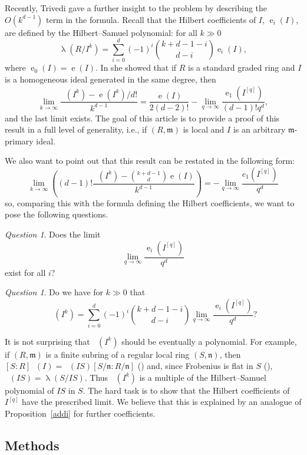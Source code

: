 \documentclass[12pt]{amsart}
\newcommand{\length}{\operatorname{\lambda}}
\newcommand{\mf}[1]{\mathfrak #1}
\DeclareMathOperator{\eh}{e}
\DeclareMathOperator{\ehk}{e_{HK}}
\renewcommand{\frq}[1]{{#1}^{[q]}}
\theoremstyle{definition}
\theoremstyle{remark}
\newtheorem{question}[theorem]{Question}
\numberwithin{theorem}{section}
\numberwithin{equation}{section}
\begin{document}
Recently, Trivedi gave a further insight to the problem by describing the $O(k^{d-1})$ term in the formula. 
Recall that the Hilbert coefficients of $I$, $\eh_i(I)$, are defined by  the Hilbert--Samuel polynomial: 
for all $k \gg 0$
\[
\length (R/I^k) = \sum_{i = 0}^{d} (-1)^i \binom{k + d - 1 - i}{d - i} \eh_i (I),
\]
where $\eh_0(I) =\eh(I)$.
In \cite{Trivedi} she showed that if $R$ is a standard graded ring and $I$ 
is a homogeneous ideal generated in the same degree, then 
\[
\lim_{k \to \infty} \frac{\ehk(I^k) - \eh(I^k)/d!}{k^{d - 1}} = 
\frac{\eh(I)}{2(d-2)!} - \lim_{q \to \infty} \frac{\eh_1 (\frq{I})}{(d-1)!q^d},
\]
and the last limit exists.
The goal of this article is to provide a proof of this result in a full level of generality, 
i.e., if $(R, \mf m)$ is local and $I$ is an arbitrary $\mf m$-primary ideal. 

We also want to point out that this result can be restated in the following form:
\[
\lim_{k \to \infty} \left( (d-1)! \frac{\ehk(I^k) - \binom{k + d - 1}{d} \eh (I) }{k^{d-1}} \right)
= - \lim_{q \to \infty} \frac{e_1(\frq{I})}{q^d}
\]
so, comparing this with the formula defining the Hilbert coefficients, we want to pose the following questions. 

\begin{question}
Does the limit 
\[
\lim_{q \to \infty} \frac{\eh_i (\frq{I})}{q^d}
\]
exist for all $i$?
\end{question}

\begin{question}\label{q decomposition}
Do we have for $k \gg 0$ that 
\[
\ehk(I^k) = \sum_{i = 0}^{d} (-1)^i \binom{k + d - 1 - i}{d - i} \lim_{q \to \infty} \frac{\eh_i (\frq{I})}{q^d}?
\]
\end{question}

It is not surprising that $\ehk(I^k)$ should be eventually a polynomial. 
For example, if $(R, \mf m)$ is a finite subring of a regular local ring $(S, \mf n)$, then 
$[S: R]\ehk(I) = \ehk (IS)[S/\mf n : R/\mf n]$ (\cite{WatanabeYoshida}) and, 
since Frobenius is flat in $S$ (\cite{Kunz1}), $\ehk(IS) = \length (S/IS)$.
Thus $\ehk(I^k)$ is a multiple of the Hilbert--Samuel polynomial of $IS$ in $S$.  
The hard task is to show that the Hilbert coefficients of $\frq{I}$ have the prescribed limit.
We believe that this is explained by an analogue of Proposition~\ref{addi} for further coefficients. 

\subsection{Methods}
\end{document}
